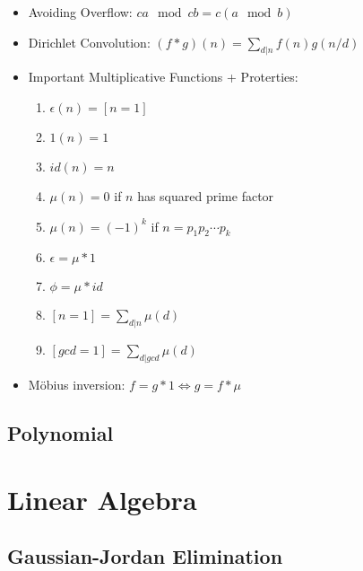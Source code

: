 \documentclass[a4paper,10pt,twocolumn,oneside]{article}
\begin{document}
{\begin{itemize}
    \item Avoiding Overflow:
    $ca \mod cb = c(a \mod b)$
    
    \item Dirichlet Convolution: $(f * g)(n) = \sum_{d|n} f(n)g(n/d)$
    
    \item Important Multiplicative Functions + Proterties:
    \begin{enumerate}[nolistsep]
        \item $\epsilon(n) = [n = 1]$
        \item $1(n) = 1$
        \item $id(n) = n$
        \item $\mu(n) = 0$ if $n$ has squared prime factor
        \item $\mu(n) = (-1)^k$ if $n = p_1 p_2 \cdots p_k$
        \item $\epsilon = \mu * 1$
        \item $\phi = \mu * id$
        \item $[n=1] = \sum_{d|n} \mu(d)$
        \item $[gcd=1] = \sum_{d|gcd} \mu(d)$
    \end{enumerate}
    
    \item Möbius inversion:
    $f = g * 1 \Leftrightarrow g = f * \mu$
\end{itemize}}

\subsection{Polynomial}







\section{Linear Algebra}

\subsection{Gaussian-Jordan Elimination}

\end{document}
